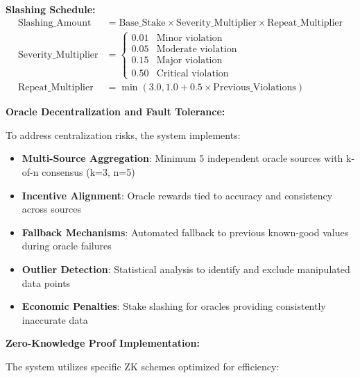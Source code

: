 \documentclass[12pt,a4paper]{article}
\begin{document}
\textbf{Slashing Schedule:}
\begin{align}
\text{Slashing\_Amount} &= \text{Base\_Stake} \times \text{Severity\_Multiplier} \times \text{Repeat\_Multiplier} \\
\text{Severity\_Multiplier} &= \begin{cases}
0.01 & \text{Minor violation} \\
0.05 & \text{Moderate violation} \\
0.15 & \text{Major violation} \\
0.50 & \text{Critical violation}
\end{cases} \\
\text{Repeat\_Multiplier} &= \min(3.0, 1.0 + 0.5 \times \text{Previous\_Violations})
\end{align}

\textbf{Oracle Decentralization and Fault Tolerance:}

To address centralization risks, the system implements:

\begin{itemize}
\item \textbf{Multi-Source Aggregation}: Minimum 5 independent oracle sources with k-of-n consensus (k=3, n=5)
\item \textbf{Incentive Alignment}: Oracle rewards tied to accuracy and consistency across sources
\item \textbf{Fallback Mechanisms}: Automated fallback to previous known-good values during oracle failures
\item \textbf{Outlier Detection}: Statistical analysis to identify and exclude manipulated data points
\item \textbf{Economic Penalties}: Stake slashing for oracles providing consistently inaccurate data
\end{itemize}

\textbf{Zero-Knowledge Proof Implementation:}

The system utilizes specific ZK schemes optimized for efficiency:
\end{document}
